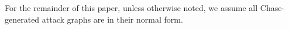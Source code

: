 \documentclass[runningheads]{llncs}
\theoremstyle{definition}
\begin{document}
For the remainder of this paper, unless otherwise noted, we assume all Chase-generated attack graphs are in their normal form.




\end{document}
